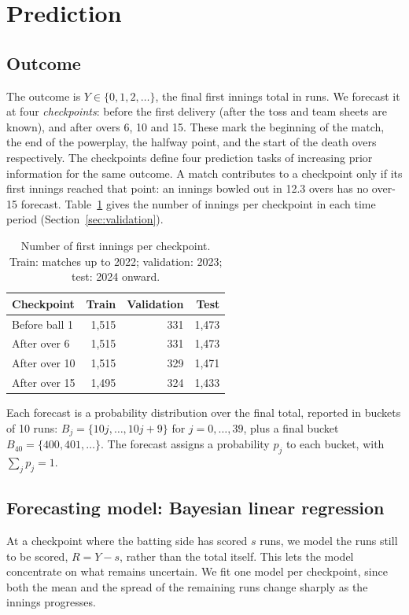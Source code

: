 \documentclass{article}
\newcommand{\1}{\mathbf{1}}
\begin{document}
\section{Prediction}

\subsection{Outcome}
The outcome is $Y \in \{0, 1, 2, \dots\}$, the final first innings total in runs. We forecast it at four \emph{checkpoints}: before the first delivery (after the toss and team sheets are known), and after overs 6, 10 and 15. These mark the beginning of the match, the end of the powerplay, the halfway point, and the start of the death overs respectively. The checkpoints define four prediction tasks of increasing prior information for the same outcome. A match contributes to a checkpoint only if its first innings reached that point: an innings bowled out in 12.3 overs has no over-15 forecast. Table~\ref{tab:counts} gives the number of innings per checkpoint in each time period (Section~\ref{sec:validation}).

\begin{table}[h]
\centering
\caption{Number of first innings per checkpoint. Train: matches up to 2022; validation: 2023; test: 2024 onward.}
\label{tab:counts}
\begin{tabular}{lrrr}
\toprule
Checkpoint & Train & Validation & Test \\
\midrule
Before ball 1 & 1{,}515 & 331 & 1{,}473 \\
After over 6  & 1{,}515 & 331 & 1{,}473 \\
After over 10 & 1{,}515 & 329 & 1{,}471 \\
After over 15 & 1{,}495 & 324 & 1{,}433 \\
\bottomrule
\end{tabular}
\end{table}

Each forecast is a probability distribution over the final total, reported in buckets of 10 runs: $B_j = \{10j, \dots, 10j + 9\}$ for $j = 0, \dots, 39$, plus a final bucket $B_{40} = \{400, 401, \dots\}$. The forecast assigns a probability $p_j$ to each bucket, with $\sum_j p_j = 1$.

\subsection{Forecasting model: Bayesian linear regression}\label{sec:model}
At a checkpoint where the batting side has scored $s$ runs, we model the runs still to be scored, $R = Y - s$, rather than the total itself. This lets the model concentrate on what remains uncertain. We fit one model per checkpoint, since both the mean and the spread of the remaining runs change sharply as the innings progresses.
\end{document}

